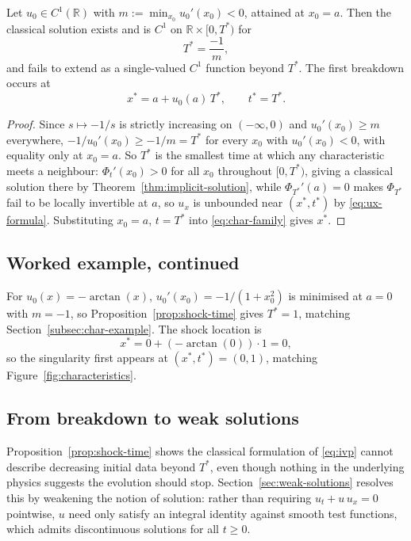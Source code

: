 \begin{proposition}
\label{prop:shock-time}
Let $u_0 \in C^1(\mathbb{R})$ with $m := \min_{x_0} u_0'(x_0) < 0$,
attained at $x_0 = a$. Then the classical solution exists and is $C^1$ on
$\mathbb{R} \times [0,T^*)$ for
\begin{equation}
  \label{eq:shock-time}
  T^* = \frac{-1}{m},
\end{equation}
and fails to extend as a single-valued $C^1$ function beyond $T^*$. The
first breakdown occurs at
\begin{equation}
  \label{eq:shock-location}
  x^* = a + u_0(a)\, T^*, \qquad t^* = T^*.
\end{equation}
\end{proposition}

\begin{proof}
Since $s \mapsto -1/s$ is strictly increasing on $(-\infty,0)$ and
$u_0'(x_0) \geq m$ everywhere, $-1/u_0'(x_0) \geq -1/m = T^*$ for every
$x_0$ with $u_0'(x_0)<0$, with equality only at $x_0=a$. So $T^*$ is the
smallest time at which any characteristic meets a neighbour:
$\Phi_t'(x_0)>0$ for all $x_0$ throughout $[0,T^*)$, giving a classical
solution there by Theorem~\ref{thm:implicit-solution}, while
$\Phi_{T^*}'(a)=0$ makes $\Phi_{T^*}$ fail to be locally invertible at
$a$, so $u_x$ is unbounded near $(x^*,t^*)$ by \eqref{eq:ux-formula}.
Substituting $x_0=a$, $t=T^*$ into \eqref{eq:char-family} gives $x^*$.
\end{proof}

\subsection{Worked example, continued}
\label{subsec:shock-example}

For $u_0(x) = -\arctan(x)$, $u_0'(x_0) = -1/(1+x_0^2)$ is minimised at
$a=0$ with $m=-1$, so Proposition~\ref{prop:shock-time} gives $T^*=1$,
matching Section~\ref{subsec:char-example}. The shock location is
\begin{equation}
  x^* = 0 + (-\arctan(0))\cdot 1 = 0,
\end{equation}
so the singularity first appears at $(x^*,t^*) = (0,1)$, matching
Figure~\ref{fig:characteristics}.

\subsection{From breakdown to weak solutions}
\label{subsec:shock-transition}

Proposition~\ref{prop:shock-time} shows the classical formulation of
\eqref{eq:ivp} cannot describe decreasing initial data beyond $T^*$, even
though nothing in the underlying physics suggests the evolution should
stop. Section~\ref{sec:weak-solutions} resolves this by weakening the
notion of solution: rather than requiring $u_t+u\,u_x=0$ pointwise, $u$
need only satisfy an integral identity against smooth test functions,
which admits discontinuous solutions for all $t \geq 0$.
